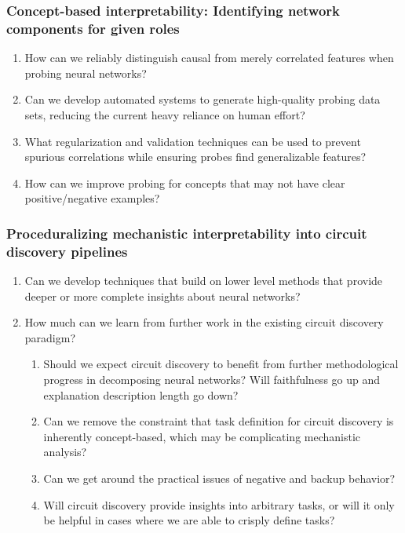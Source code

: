 \subsubsection{Concept-based interpretability: Identifying network components for given roles}
\begin{enumerate}
    \item How can we reliably distinguish causal from merely correlated features when probing neural networks?
    
    \item Can we develop automated systems to generate high-quality probing data sets, reducing the current heavy reliance on human effort?
    
    \item What regularization and validation techniques can be used to prevent spurious correlations while ensuring probes find generalizable features?
    
    \item How can we improve probing for concepts that may not have clear positive/negative examples?
\end{enumerate}

\subsubsection{Proceduralizing mechanistic interpretability into circuit discovery pipelines}
\begin{enumerate}
    \item Can we develop techniques that build on lower level methods that provide deeper or more complete insights about neural networks?
    \item How much can we learn from further work in the existing circuit discovery paradigm?
    \begin{enumerate}[label=\alph*.]
        \item Should we expect circuit discovery to benefit from further methodological progress in decomposing neural networks? Will faithfulness go up and explanation description length go down?
        \item Can we remove the constraint that task definition for circuit discovery is inherently concept-based, which may be complicating mechanistic analysis?
        \item Can we get around the practical issues of negative and backup behavior?
        \item Will circuit discovery provide insights into arbitrary tasks, or will it only be helpful in cases where we are able to crisply define tasks?
    \end{enumerate}
\end{enumerate}

